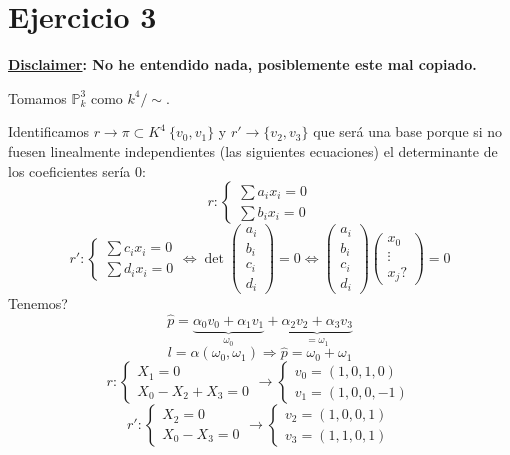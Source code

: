 \documentclass[10pt,a4paper,openright]{book}
\theoremstyle{break}
\begin{document}
\section{Ejercicio 3}%
\label{sec:ejercicio_3}
\textbf{\underline{Disclaimer}: No he entendido nada, posiblemente este mal copiado.} 

Tomamos $\mathbb{P}^{3}_{k}$ como $k^4 / \sim$. 

Identificamos $r \rightarrow \pi \subset K^4\ \{v_0, v_1\}$ y $r' \rightarrow \{v_2, v_3\}$ que será una base porque si no fuesen linealmente independientes (las siguientes ecuaciones) el determinante de los coeficientes sería $0$: 
\[
r : \begin{cases}
    \sum a_ix_i = 0\\
    \sum b_i x_i = 0
\end{cases} 
\]\[
r' : \begin{cases}
    \sum c_i x_i = 0\\
    \sum d_i x_i = 0
\end{cases} \Leftrightarrow \det \begin{pmatrix} a_i\\ b_i\\ c_i\\ d_i \end{pmatrix} = 0 \Leftrightarrow \begin{pmatrix} a_i\\ b_i\\ c_i\\ d_i \end{pmatrix} \begin{pmatrix} x_0\\ \vdots\\ x_j? \end{pmatrix} = 0
\]
Tenemos?
\[
\hat{p} = \underbrace{\alpha_0 v_0 + \alpha_1 v_1}_{\omega_0} + \underbrace{\alpha_2 v_2 + \alpha_3 v_3}_{= \omega_1} 
\]\[
l = \alpha\left( \omega_0, \omega_1 \right) \Rightarrow \hat{p} = \omega_0 + \omega_1
\]
\[
r : \begin{cases}
    X_1 = 0\\
    X_0 - X_2 + X_3 = 0
\end{cases} \rightarrow \begin{cases}
    v_0 = \left( 1, 0, 1, 0 \right) \\
    v_1 = \left( 1, 0, 0, -1 \right) 
\end{cases} 
\]\[
r' : \begin{cases}
    X_2 = 0\\
    X_0 - X_3 = 0
\end{cases} \rightarrow \begin{cases}
    v_2 = \left( 1, 0, 0, 1 \right) \\
    v_3 = \left( 1, 1, 0, 1 \right) 
\end{cases} 
\]
\end{document}
